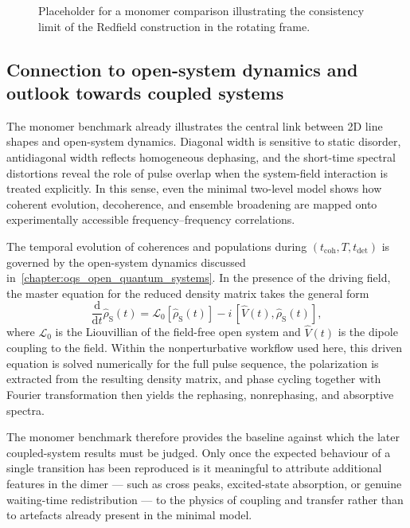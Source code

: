 \begin{figure}[htbp]
    \centering
    \caption{Placeholder for a monomer comparison illustrating the consistency
    limit of the Redfield construction in the rotating frame.}
    \label{fig:rslts_monomer_redfield_consistency}
\end{figure}

\subsection{Connection to open-system dynamics and outlook towards coupled systems}
\label{sec:2D_interpretation_OQS}

The monomer benchmark already illustrates the central link between 2D line
shapes and open-system dynamics.
Diagonal width is sensitive to static disorder, antidiagonal width reflects
homogeneous dephasing, and the short-time spectral distortions reveal the role of
pulse overlap when the system-field interaction is treated explicitly.
In this sense, even the minimal two-level model shows how coherent evolution,
decoherence, and ensemble broadening are mapped onto experimentally accessible
frequency--frequency correlations.

The temporal evolution of coherences and populations during
$(t_{\mathrm{coh}},T,t_{\mathrm{det}})$ is governed by the open-system dynamics
discussed in~\autoref{chapter:oqs_open_quantum_systems}.
In the presence of the driving field, the master equation for the reduced density
matrix takes the general form
\begin{equation}
    \frac{\mathrm{d}}{\mathrm{d}t}\hat{\rho}_{\mathrm{S}}(t)
    =
    \mathcal{L}_0[\hat{\rho}_{\mathrm{S}}(t)]
    -
    i\,[\hat{V}(t),\hat{\rho}_{\mathrm{S}}(t)],
    \label{eq:ME_with_field}
\end{equation}
where $\mathcal{L}_0$ is the Liouvillian of the field-free open system and
$\hat{V}(t)$ is the dipole coupling to the field.
Within the nonperturbative workflow used here, this driven equation is solved
numerically for the full pulse sequence, the polarization is extracted from the
resulting density matrix, and phase cycling together with Fourier transformation
then yields the rephasing, nonrephasing, and absorptive spectra.

The monomer benchmark therefore provides the baseline against which the later
coupled-system results must be judged.
Only once the expected behaviour of a single transition has been reproduced is it
meaningful to attribute additional features in the dimer --- such as cross peaks,
excited-state absorption, or genuine waiting-time redistribution --- to the
physics of coupling and transfer rather than to artefacts already present in the
minimal model.



